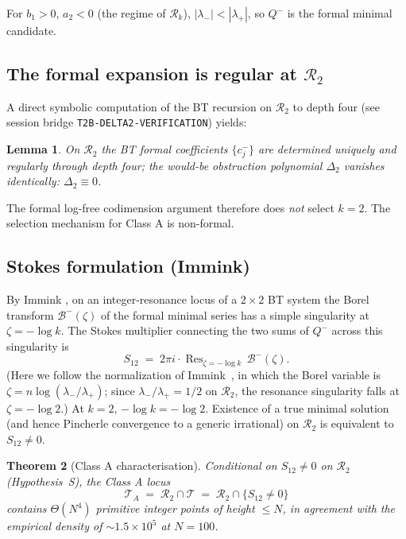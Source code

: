 \documentclass[11pt,a4paper]{article}
\newtheorem{theorem}{Theorem}
\newtheorem{lemma}[theorem]{Lemma}
\theoremstyle{definition}
\begin{document}
For $b_1>0$, $a_2<0$ (the regime of $\mathcal{R}_k$), $|\lambda_-|<|\lambda_+|$, so $Q^-$ is the formal minimal candidate.

\subsection{The formal expansion is regular at $\mathcal{R}_2$}

A direct symbolic computation of the BT recursion on $\mathcal{R}_2$ to depth four (see session bridge \texttt{T2B-DELTA2-VERIFICATION}) yields:

\begin{lemma}\label{lem:Delta2-trivial}
On $\mathcal{R}_2$ the BT formal coefficients $\{c_j^-\}$ are determined uniquely and regularly through depth four; the would-be obstruction polynomial $\Delta_2$ vanishes identically: $\Delta_2 \equiv 0$.
\end{lemma}

The formal log-free codimension argument therefore does \emph{not} select $k=2$. The selection mechanism for Class A is non-formal.

\subsection{Stokes formulation (Immink)}

By Immink \cite[\S 5, Lem.~5.3]{immink1984}, on an integer-resonance locus of a $2\times 2$ BT system the Borel transform $\mathcal{B}^-(\zeta)$ of the formal minimal series has a simple singularity at $\zeta = -\log k$. The Stokes multiplier connecting the two sums of $Q^-$ across this singularity is
\begin{equation}\label{eq:S12-residue}
  S_{12} \;=\; 2\pi i \cdot \operatorname{Res}_{\zeta = -\log k}\,\mathcal{B}^-(\zeta).
\end{equation}
(Here we follow the normalization of Immink~\cite{immink1984}, in which the Borel variable is $\zeta = n\log(\lambda_-/\lambda_+)$; since $\lambda_-/\lambda_+ = 1/2$ on $\mathcal{R}_2$, the resonance singularity falls at $\zeta = -\log 2$.)
At $k=2$, $-\log k = -\log 2$. Existence of a true minimal solution (and hence Pincherle convergence to a generic irrational) on $\mathcal{R}_2$ is equivalent to $S_{12}\ne 0$.

\begin{theorem}[Class A characterisation]\label{thm:k2-stokes}
Conditional on $S_{12}\ne 0$ on $\mathcal{R}_2$ (Hypothesis~S), the Class A locus
\[
  \mathcal{T}_A \;=\; \mathcal{R}_2 \cap \mathcal{T} \;=\; \mathcal{R}_2 \cap \{S_{12}\ne 0\}
\]
contains $\Theta(N^4)$ primitive integer points of height $\le N$, in agreement with the empirical density of $\sim 1.5\times 10^5$ at $N=100$.
\end{theorem}
\end{document}
